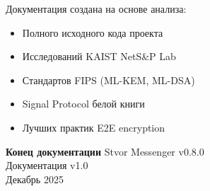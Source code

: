 \documentclass[11pt,a4paper,oneside]{book}
\begin{document}
Документация создана на основе анализа:
\begin{itemize}
  \item Полного исходного кода проекта
  \item Исследований KAIST NetS\&P Lab
  \item Стандартов FIPS (ML-KEM, ML-DSA)
  \item Signal Protocol белой книги
  \item Лучших практик E2E encryption
\end{itemize}
\begin{center}
  \Large{\textbf{Конец документации}}
    Stvor Messenger v0.8.0 \\
  Документация v1.0 \\
  Декабрь 2025
\end{center}
\end{document}
